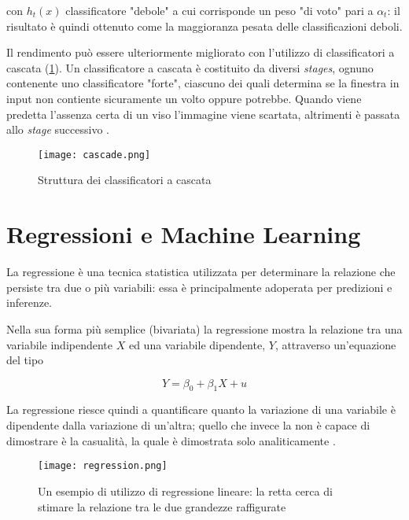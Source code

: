 con $h_t(x)$ classificatore "debole" a cui corrisponde un peso "di voto" pari a $\alpha_t$:
il risultato è quindi ottenuto come la maggioranza pesata delle classificazioni deboli.

\medskip

Il rendimento può essere ulteriormente migliorato con l'utilizzo di classificatori a cascata 
(\ref{fig:cascade}). Un classificatore a cascata è costituito da diversi \textit{stages}, 
ognuno contenente uno classificatore "forte", ciascuno dei quali determina se la finestra in 
input non contiente sicuramente un volto oppure potrebbe. Quando viene predetta l'assenza 
certa di un viso l'immagine viene scartata, altrimenti è passata allo \textit{stage} successivo 
\cite{Datta2015}.

\begin{figure}
    \begin{small}
        \begin{center}
            \texttt{[image: cascade.png]}
        \end{center}
        \caption{Struttura dei classificatori a cascata}
        \label{fig:cascade}
    \end{small}
\end{figure}

\newpage

\section{Regressioni e Machine Learning}

La regressione è una tecnica statistica utilizzata per determinare la relazione che persiste tra
due o più variabili: essa è principalmente adoperata per predizioni e inferenze.

Nella sua forma più semplice (bivariata) la regressione mostra la relazione tra una variabile 
indipendente $X$ ed una variabile dipendente, $Y$, attraverso un'equazione del tipo

\begin{equation}
    Y = \beta_0 + \beta_1 X + u
    \label{eq:biv_regression}
\end{equation}

La regressione riesce quindi a quantificare quanto la variazione di una variabile è dipendente 
dalla variazione di un'altra; quello che invece la non è capace di dimostrare è la casualità, 
la quale è dimostrata solo analiticamente \cite{campbell2008introduction}.

\begin{figure}[bh]
    \begin{small}
        \begin{center}
            \texttt{[image: regression.png]}
        \end{center}
        \caption{Un esempio di utilizzo di regressione lineare: la retta cerca 
            di stimare la relazione tra le due grandezze raffigurate}
        \label{fig:}
    \end{small}
\end{figure}

